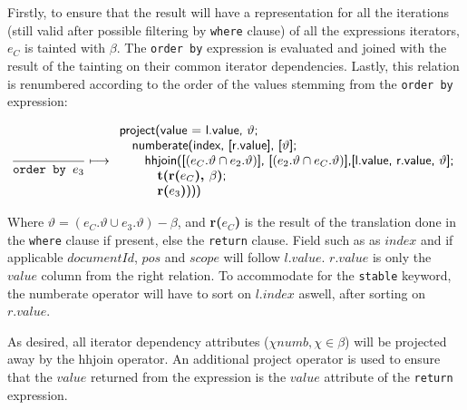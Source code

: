 Firstly, to ensure that the result will have a representation for all the iterations (still valid after possible
filtering by \texttt{where} clause) of all the expressions iterators, $e_C$ is tainted with $\beta$. The
\texttt{order by} expression is evaluated and joined with the result of the tainting on their common iterator
dependencies. Lastly, this relation is renumbered according to the order of the values stemming from the
\texttt{order by} expression:

\begin{equation}
\frac{}{\mbox{\texttt{order by }}e_3}\longmapsto
\begin{array}{l}
\mbox{\textsf{project(value = l.value, }}\vartheta\mbox{\textsf{;}}\\ \quad
\mbox{\textsf{numberate(index, [r.value], [}}\vartheta\mbox{\textsf{];}} \\ \quad \quad
\mbox{\textsf{hhjoin([}}(e_{C}.\vartheta \cap e_2.\vartheta)\mbox{\textsf{], [}}(e_{2}.\vartheta \cap
e_{C}.\vartheta)\mbox{\textsf{],}} 
\mbox{\textsf{[l.value, r.value, }} \vartheta\mbox{\textsf{];}} \\ \quad \quad
\quad \mbox{\textbf{t(r(}}e_C\mbox{\textbf{), }}\beta\mbox{\textbf{)}\textsf{;}} \\ \quad \quad \quad
\mbox{\textbf{r(}}e_3\mbox{\textbf{)}\textsf{)))}}
\end{array}
\label{rule:trans:TD:orderbyOrd}
\end{equation}

Where $\vartheta = (e_C.\vartheta \cup e_3.\vartheta)-\beta$, and \textbf{r(}$e_{C}$\textbf{)} is the result of
the translation done in the \texttt{where} clause if present, else the \texttt{return} clause. Field such as as
$index$ and if applicable $documentId$, $pos$ and $scope$ will follow $l.value$. $r.value$ is only the $value$
column from the right relation. To accommodate for the \texttt{stable} keyword, the \textsf{numberate} operator
will have to sort on $l.index$ aswell, after sorting on $r.value$.

As desired, all iterator dependency attributes ($\chi{numb}, \chi \in \beta$) will be projected away by the
\textsf{hhjoin} operator. An additional \textsf{project} operator is used to ensure that the $value$ returned from
the expression is the $value$ attribute of the \texttt{return} expression.


